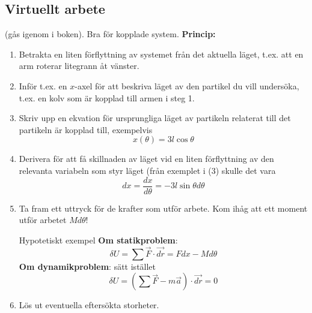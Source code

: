 \documentclass{article}
\newenvironment{ankiflashcard}[1]{}{}
\begin{document}
\begin{appendix}
\begin{ankiflashcard}{Förklara virtuellt arbete.}
    
\section{Virtuellt arbete}
(gås igenom i boken). Bra för kopplade system. \textbf{Princip:}
\begin{enumerate}
    \item Betrakta en liten förflyttning av systemet från det aktuella läget, t.ex. att en arm roterar litegrann åt vänster.
    \item Inför t.ex. en $x$-axel för att beskriva läget av den partikel du vill undersöka, t.ex. en kolv som är kopplad till armen i steg 1.
    \item Skriv upp en ekvation för ursprungliga läget av partikeln relaterat till det partikeln är kopplad till, exempelvis $$x(\theta)=3l\cos \theta$$
    \item Derivera för att få skillnaden av läget vid en liten förflyttning av den relevanta variabeln som styr läget (från exemplet i (3) skulle det vara $$dx=\frac{dx}{d\theta}=-3l\sin \theta d\theta$$
    \item Ta fram ett uttryck för de krafter som utför arbete. Kom ihåg att ett moment utför arbetet $Md\theta$! 
    
    Hypotetiskt exempel
    \textbf{Om statikproblem}: $$\delta U = \sum \vec{F}\cdot \vec{dr} = Fdx-Md\theta$$
    \textbf{Om dynamikproblem}: sätt istället $$\delta U = (\sum \vec F -m\vec a)\cdot \vec{dr} = 0$$
    \item Lös ut eventuella eftersökta storheter.
\end{enumerate}
\end{ankiflashcard}

\end{appendix}
\end{document}
